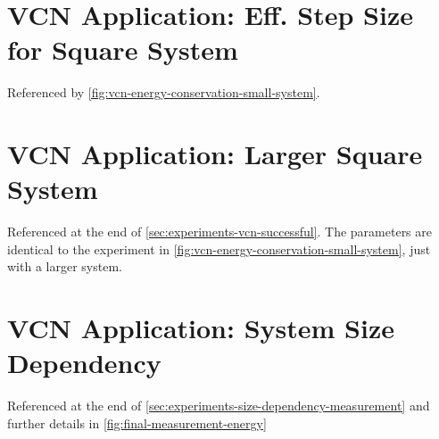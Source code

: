 \newpage
\begin{minipage}{\textwidth}
    \section{VCN Application: Eff. Step Size for Square System}
        \label{appendix:vcn-success-small}
        Referenced by \autoref{fig:vcn-energy-conservation-small-system}.\\
        \vbox{
        }
\end{minipage}

\newpage
\begin{minipage}{\textwidth}
    \section{VCN Application: Larger Square System}
        \label{appendix:vcn-success-big}
        Referenced at the end of \autoref{sec:experiments-vcn-successful}. The parameters are identical to the experiment in \autoref{fig:vcn-energy-conservation-small-system}, just with a larger system.\\
        \vbox{
        }
\end{minipage}
\newpage
\begin{minipage}{\textwidth}
    \vbox{
    }
\end{minipage}


\newpage
\begin{minipage}{\textwidth}
    \section{VCN Application: System Size Dependency}
        \label{appendix:vcn-system-size-dependency}
        Referenced at the end of \autoref{sec:experiments-size-dependency-measurement} and further details in \autoref{fig:final-measurement-energy}\\
        \vbox{
        }
\end{minipage}
\newpage
\begin{minipage}{\textwidth}
    \vbox{
    }
\end{minipage}


